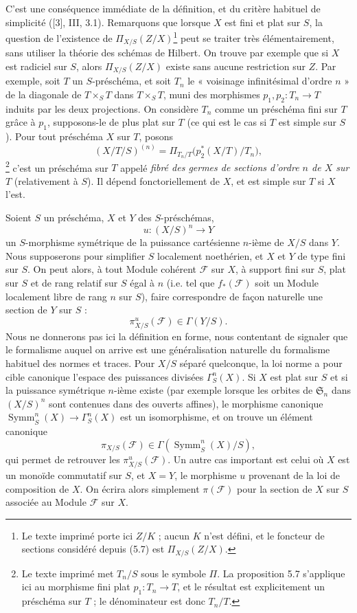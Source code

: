 C'est une conséquence immédiate de la définition, et du critère habituel de
simplicité ([3], III, 3.1). Remarquons que lorsque $X$ est fini et plat sur
$S$, la question de l'existence de $\Pi_{X/S}(Z/X)$\footnote{Le texte imprimé
porte ici $Z/K$ ; aucun $K$ n'est défini, et le foncteur de sections considéré
depuis (5.7) est $\Pi_{X/S}(Z/X)$.} peut se traiter très élémentairement, sans
utiliser la théorie des schémas de Hilbert. On trouve par exemple que si $X$
est radiciel sur $S$, alors $\Pi_{X/S}(Z/X)$ existe sans aucune restriction sur
$Z$. Par exemple, soit $T$ un $S$-préschéma, et soit $T_n$ le « voisinage
infinitésimal d'ordre $n$ » de la diagonale de $T\times_ST$ dans $T\times_ST$,
muni des morphismes $p_1,p_2:T_n\longrightarrow T$ induits par les deux
projections. On considère $T_n$ comme un préschéma fini sur $T$ grâce à $p_1$,
supposons-le de plus plat sur $T$ (ce qui est le cas si $T$ est simple sur $S$).
Pour tout préschéma $X$ sur $T$, posons
\[
(X/T/S)^{(n)}=
\Pi_{T_n/T}\bigl(p_2^*(X/T)/T_n\bigr),
\]
\footnote{Le texte imprimé met $T_n/S$ sous le symbole $\Pi$. La proposition
5.7 s'applique ici au morphisme fini plat $p_1:T_n\to T$, et le résultat est
explicitement un préschéma sur $T$ ; le dénominateur est donc $T_n/T$.}
c'est un préschéma sur $T$ appelé \emph{fibré des germes de sections d'ordre
$n$ de $X$ sur $T$} (relativement à $S$). Il dépend fonctoriellement de $X$, et
est simple sur $T$ si $X$ l'est.


Soient $S$ un préschéma, $X$ et $Y$ des $S$-préschémas,
\[
u:(X/S)^n\longrightarrow Y
\]
un $S$-morphisme symétrique de la puissance cartésienne $n$-ième de $X/S$ dans
$Y$. Nous supposerons pour simplifier $S$ localement noethérien, et $X$ et $Y$
de type fini sur $S$. On peut alors, à tout Module cohérent $\mathcal F$ sur
$X$, à support fini sur $S$, plat sur $S$ et de rang relatif sur $S$ égal à $n$
(i.e. tel que $f_*(\mathcal F)$ soit un Module localement libre de rang $n$ sur
$S$), faire correspondre de façon naturelle une section de $Y$ sur $S$ :
\[
\pi^u_{X/S}(\mathcal F)\in\Gamma(Y/S).
\]
Nous ne donnerons pas ici la définition en forme, nous contentant de signaler
que le formalisme auquel on arrive est une généralisation naturelle du
formalisme habituel des normes et traces. Pour $X/S$ séparé quelconque, la loi norme a pour cible canonique l'espace des puissances divisées $\Gamma^n_S(X)$. Si $X$ est plat sur $S$ et si la puissance symétrique $n$-ième existe (par exemple lorsque les orbites de $\mathfrak S_n$ dans $(X/S)^n$ sont contenues dans des ouverts affines), le morphisme canonique $\operatorname{Symm}^n_S(X)\to\Gamma^n_S(X)$ est un isomorphisme, et on trouve un élément canonique
\[
\pi_{X/S}(\mathcal F)\in\Gamma(\operatorname{Symm}^n_S(X)/S),
\]
qui permet de retrouver les $\pi^u_{X/S}(\mathcal F)$. Un autre cas important
est celui où $X$ est un monoïde commutatif sur $S$, et $X=Y$, le morphisme $u$
provenant de la loi de composition de $X$. On écrira alors simplement
$\pi(\mathcal F)$ pour la section de $X$ sur $S$ associée au Module
$\mathcal F$ sur $X$.


